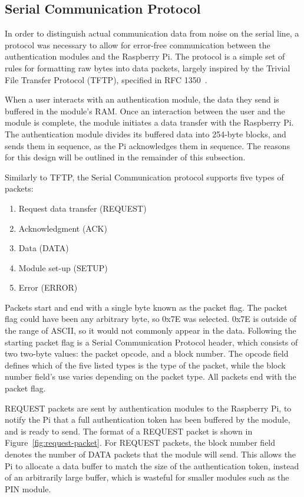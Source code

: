 \documentclass[12pt]{report}
\let\Oldsubsection\subsection
\renewcommand{\subsection}{\FloatBarrier\Oldsubsection}
\begin{document}
\subsection{Serial Communication Protocol} \label{serial-communication-protocol}

In order to distinguish actual communication data from noise on the serial line, a protocol was necessary to allow for 
error-free communication between the authentication modules and the Raspberry Pi. The protocol is a simple set of rules 
for formatting raw bytes into data packets, largely inspired by the Trivial File Transfer Protocol (TFTP), specified in 
RFC 1350~\autocite{RFC1350}.

When a user interacts with an authentication module, the data they send is buffered in the module's RAM. Once an 
interaction between the user and the module is complete, the module initiates a data transfer with the Raspberry Pi. 
The authentication module divides its buffered data into 254-byte blocks, and sends them in sequence, as the Pi 
acknowledges them in sequence. The reasons for this design will be outlined in the remainder of this subsection.

Similarly to TFTP, the Serial Communication protocol supports five types of packets:
\begin{enumerate}
    \item Request data transfer (REQUEST)
    \item Acknowledgment (ACK)
    \item Data (DATA)
    \item Module set-up (SETUP)
    \item Error (ERROR)
\end{enumerate}
Packets start and end with a single byte known as the packet flag. The packet flag could have been any arbitrary byte, 
so 0x7E was selected. 0x7E is outside of the range of ASCII, so it would not commonly appear in the data. Following the 
starting packet flag is a Serial Communication Protocol header, which consists of two two-byte values: the packet 
opcode, and a block number. The opcode field defines which of the five listed types is the type of the packet, while 
the block number field's use varies depending on the packet type. All packets end with the packet flag.

REQUEST packets are sent by authentication modules to the Raspberry Pi, to notify the Pi that a full authentication 
token has been buffered by the module, and is ready to send. The format of a REQUEST packet is shown in 
Figure~\ref{fig:request-packet}. For REQUEST packets, the block number field denotes the number of DATA packets that 
the module will send. This allows the Pi to allocate a data buffer to match the size of the authentication token, 
instead of an arbitrarily large buffer, which is wasteful for smaller modules such as the PIN module.
\end{document}
